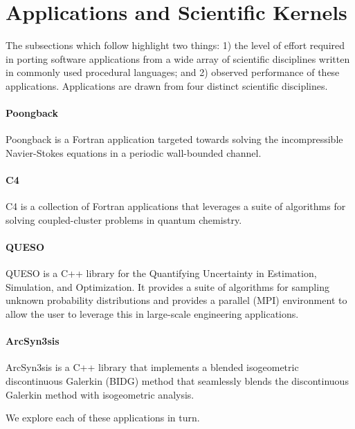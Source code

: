 \section{Applications and Scientific Kernels}
\label{sec:apps}

The subsections which follow highlight two things: 1) the level of effort
required in porting software applications from a wide array of scientific
disciplines written in commonly used procedural languages; and 2) observed
performance of these applications.  Applications are drawn from four distinct
scientific disciplines.

\paragraph{Poongback}  Poongback is a Fortran application targeted towards
solving the incompressible Navier-Stokes equations in a periodic wall-bounded
channel.

\paragraph{C4}  C4 is a collection of Fortran applications that leverages a
suite of algorithms for solving coupled-cluster problems in quantum chemistry.

\paragraph{QUESO}  QUESO is a C++ library for the Quantifying Uncertainty in
Estimation, Simulation, and Optimization.  It provides a suite of algorithms
for sampling unknown probability distributions and provides a parallel (MPI)
environment to allow the user to leverage this in large-scale engineering
applications.

\paragraph{ArcSyn3sis}  ArcSyn3sis is a C++ library that implements a
blended isogeometric discontinuous Galerkin (BIDG) method that seamlessly blends the discontinuous Galerkin method with isogeometric analysis.

We explore each of these applications in turn.
